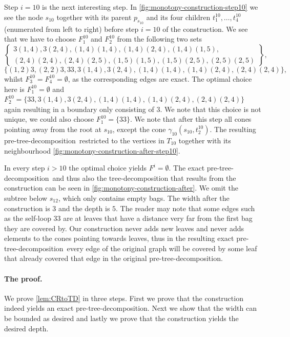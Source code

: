 \documentclass{lmcs}
\theoremstyle{plain}\newtheorem{claim}[thm]{Claim}   %
\newcommand{\preTreeDec}{pre-tree-decomposition}
\begin{document}
\begin{exa}
	Step $i=10$ is the next interesting step.
	In \autoref{fig:monotony-construction-step10} we see the node $s_{10}$ together with its parent $p_{s_{10}}$ and its four children $t^{10}_1,\ldots,t^{10}_4$ (enumerated from left to right) before step $i=10$ of the construction.
	We see that we have to choose $F^{10}_1$ and $F^{10}_2$ from the following two sets 
	\[\left\{\begin{matrix}
		3(1,4), 3(2,4), (1,4)(1,4), (1,4)(2,4), (1,4)(1,5),\\
		(2,4)(2,4), (2,4)(2,5), (1,5)(1,5), (1,5)(2,5), (2,5)(2,5)
	\end{matrix}\right\},\]
	\[\{(1,2)3, (2,2)3, 33, 3(1,4), 3(2,4), (1,4)(1,4), (1,4)(2,4), (2,4)(2,4)\},\]
	whilst $F^{10}_3=F^{10}_4=\emptyset$, as the corresponding edges are exact.
	The optimal choice here is $F^{10}_1=\emptyset$ and $F^{10}_2=\{33, 3(1,4), 3(2,4), (1,4)(1,4), (1,4)(2,4), (2,4)(2,4)\}$ again resulting in a boundary only consisting of $3$.
	We note that this choice is not unique, we could also choose $F^{10}_1=\{33\}$.
	We note that after this step all cones pointing away from the root at $s_{10}$, except the cone $\gamma_{10}(s_{10},t^{10}_2)$.
	The resulting \preTreeDec\ restricted to the vertices in $T_{10}$ together with its neighbourhood \autoref{fig:monotony-construction-after-step10}.
	
	In every step $i>10$ the optimal choice yields $F^i=\emptyset$.
	The exact \preTreeDec\ and thus also the tree-decomposition that results from the construction can be seen in \autoref{fig:monotony-construction-after}.
	We omit the subtree below $s_{12}$, which only contains empty bags.
	The width after the construction is $3$ and the depth is $5$.
	The reader may note that some edges such as the self-loop $33$ are at leaves that have a distance very far from the first bag they are covered by.
	Our construction never adds new leaves and never adds elements to the cones pointing towards leaves, thus in the resulting exact \preTreeDec\ every edge of the original graph will be covered by some leaf that already covered that edge in the original \preTreeDec.
\end{exa}

\paragraph*{The proof.}

We prove \autoref{lem:CRtoTD} in three steps.
First we prove that the construction indeed yields an exact \preTreeDec. 
Next we show that the width can be bounded as desired and lastly we prove that the construction yields the desired depth.
\end{document}
